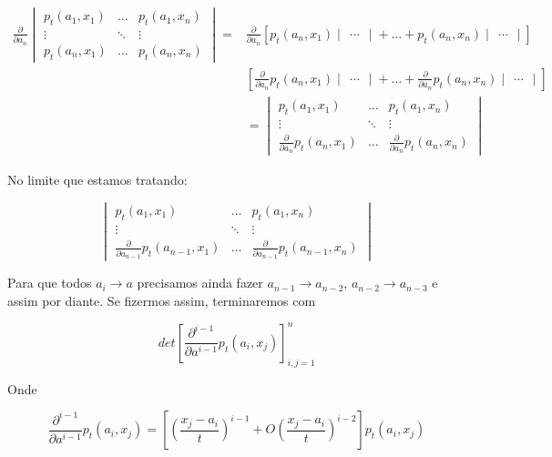 \begin{align*}
	\frac{\partial}{\partial a_n}
	\begin{vmatrix}
		p_t(a_1, x_1) & \dots & p_t(a_1, x_n) \\
		\vdots &\ddots & \vdots \\
		p_t(a_n, x_1) & \dots & p_t(a_n, x_n)
	\end{vmatrix} =
	& 	\frac{\partial}{\partial a_n} [
	p_t(a_n, x_1)
	\begin{vmatrix}
		\dots
	\end{vmatrix}
	 + \dots +
	 p_t(a_n, x_n)
	 \begin{vmatrix}
	 	\dots
	 \end{vmatrix}
	] \\
	& [
	\frac{\partial}{\partial a_n} p_t(a_n, x_1)
	\begin{vmatrix}
		\dots
	\end{vmatrix}
	+ \dots +
	\frac{\partial}{\partial a_n} p_t(a_n, x_n)
	\begin{vmatrix}
		\dots
	\end{vmatrix}
	] \\
	& = \begin{vmatrix}
		p_t(a_1, x_1) & \dots & p_t(a_1, x_n) \\
		\vdots &\ddots & \vdots \\
		\frac{\partial}{\partial a_n} p_t(a_n, x_1) & \dots & \frac{\partial}{\partial a_n} p_t(a_n, x_n)
	\end{vmatrix}
\end{align*}

No limite que estamos tratando:

\[
\begin{vmatrix}
	p_t(a_1, x_1) & \dots & p_t(a_1, x_n) \\
	\vdots &\ddots & \vdots \\
	\frac{\partial}{\partial a_{n-1}} p_t(a_{n-1}, x_1) & \dots & \frac{\partial}{\partial a_{n-1}} p_t(a_{n-1}, x_n)
\end{vmatrix}
\]

Para que todos $a_i \rightarrow a$ precisamos ainda fazer $a_{n-1} \rightarrow a_{n-2}$, $a_{n-2} \rightarrow a_{n-3}$ e assim por diante. Se fizermos assim, terminaremos com

\[
	det\left[ \frac{\partial^{i-1}}{\partial a^{i-1}} p_t(a_i, x_j) \right]_{i,j=1}^{n} 
\] 

Onde

\[
	\frac{\partial^{i-1}}{\partial a^{i-1}} p_t(a_i,x_j) = \left[ \left( \frac{x_j - a_i}{t} \right)^{i-1} + O\left( \frac{x_j - a_i}{t} \right)^{i-2} \right] p_t(a_i,x_j)
\]

